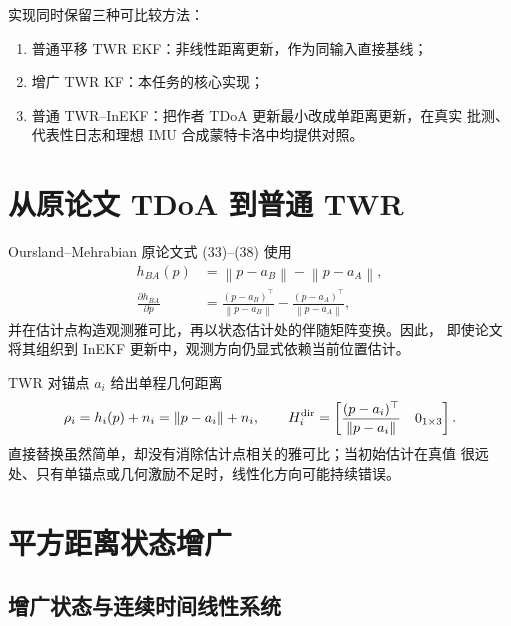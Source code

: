 \documentclass[11pt,a4paper]{ctexart}
\newcommand{\norm}[1]{\left\lVert #1\right\rVert}
\begin{document}
实现同时保留三种可比较方法：
\begin{enumerate}
 \item 普通平移 TWR EKF：非线性距离更新，作为同输入直接基线；
 \item 增广 TWR KF：本任务的核心实现；
 \item 普通 TWR--InEKF：把作者 TDoA 更新最小改成单距离更新，在真实
       批测、代表性日志和理想 IMU 合成蒙特卡洛中均提供对照。
\end{enumerate}

\section{从原论文 TDoA 到普通 TWR}

Oursland--Mehrabian 原论文式 (33)--(38) 使用
\begin{align}
 h_{BA}(p)
 &=\norm{p-a_B}-\norm{p-a_A},\\
 \frac{\partial h_{BA}}{\partial p}
 &=\frac{(p-a_B)^\top}{\norm{p-a_B}}
   -\frac{(p-a_A)^\top}{\norm{p-a_A}},
 \label{eq:tdoa}
\end{align}
并在估计点构造观测雅可比，再以状态估计处的伴随矩阵变换。因此，
即使论文将其组织到 InEKF 更新中，观测方向仍显式依赖当前位置估计。

TWR 对锚点 $a_i$ 给出单程几何距离
\begin{equation}
 \rho_i=h_i(p)+n_i=\norm{p-a_i}+n_i,\qquad
 H_i^{\rm dir}=
 \begin{bmatrix}
  \dfrac{(p-a_i)^\top}{\norm{p-a_i}}&0_{1\times3}
 \end{bmatrix}.
 \label{eq:direct-twr}
\end{equation}
直接替换虽然简单，却没有消除估计点相关的雅可比；当初始估计在真值
很远处、只有单锚点或几何激励不足时，线性化方向可能持续错误。

\section{平方距离状态增广}

\subsection{增广状态与连续时间线性系统}
\end{document}
